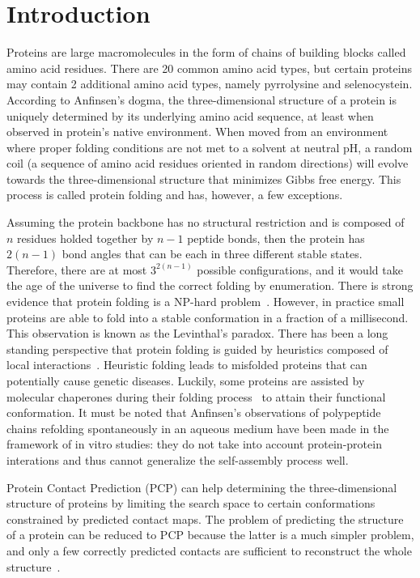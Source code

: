\chapter{Introduction}

    \setcounter{page}{1}
    \vspace*{0.5cm}

    Proteins are large macromolecules in the form of chains of building blocks called amino acid residues.
    There are 20 common amino acid types, but certain proteins may contain 2 additional amino acid types, namely pyrrolysine and selenocystein.
    According to Anfinsen's dogma, the three-dimensional structure of a protein is uniquely determined by its underlying amino acid sequence,
    at least when observed in protein's native environment. When moved from an environment where proper folding conditions are not met
    to a solvent at neutral pH, a random coil (a sequence of amino acid residues
    oriented in random directions) will evolve towards the three-dimensional structure that minimizes Gibbs free energy.
    This process is called protein folding and has, however, a few exceptions.

    Assuming the protein backbone has no structural restriction and is composed of $n$ residues holded together by $n-1$ peptide bonds,
    then the protein has $2(n-1)$ bond angles that can be each in three different stable states. Therefore, there are at most
    $3^{2(n-1)}$ possible configurations, and it would take the age of the universe to find the correct folding by enumeration.
    There is strong evidence that protein folding is a NP-hard problem~\cite{hart1997robust}.
    However, in practice small proteins are able to fold into a stable conformation in a fraction of a millisecond.
    This observation is known as the Levinthal's paradox. There has been a long standing perspective that protein folding
    is guided by heuristics composed of local interactions~\cite{levinthal1969fold}. Heuristic folding leads to misfolded proteins
    that can potentially cause genetic diseases. Luckily, some proteins are assisted by molecular chaperones during their folding process~\cite{ellis1991molecular}
    to attain their functional conformation. It must be noted that Anfinsen's observations of polypeptide chains refolding spontaneously in an aqueous medium
    have been made in the framework of in vitro studies: they do not take into account protein-protein interations and thus cannot generalize the
    self-assembly process well.

    Protein Contact Prediction (PCP) can help determining the three-dimensional structure of proteins by limiting the search space to certain conformations
    constrained by predicted contact maps. The problem of predicting the structure of a protein can be reduced to PCP because the latter is a much simpler problem,
    and only a few correctly predicted contacts are sufficient to reconstruct the whole structure~\cite{kim2014one}.

